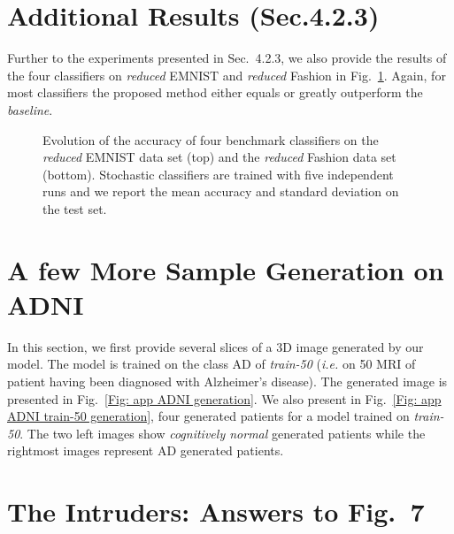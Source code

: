 \documentclass[10pt,journal,compsoc]{IEEEtran}
\begin{document}
\section{Additional Results (Sec.4.2.3)}\label{appendix F}
Further to the experiments presented in Sec.~4.2.3, we also provide the results of the four classifiers on \emph{reduced} EMNIST and \emph{reduced} Fashion in Fig.~\ref{Fig: app Classifiers rob}. Again, for most classifiers the proposed method either equals or greatly outperform the \emph{baseline}. 

\begin{figure}[ht] 
  \centering
  \hfil
  \centering
  
  \caption{Evolution of the accuracy of four benchmark classifiers on the \emph{reduced} EMNIST data set (top) and the \emph{reduced} Fashion data set (bottom). Stochastic classifiers are trained with five independent runs and we report the mean accuracy and standard deviation on the test set.}
  \label{Fig: app Classifiers rob}
  \end{figure}



\section{A few More Sample Generation on ADNI}\label{appendix G}

In this section, we first provide several slices of a 3D image generated by our model. The model is trained on the class AD of \emph{train-50} (\emph{i.e.} on 50 MRI of patient having been diagnosed with Alzheimer's disease). The generated image is presented in Fig.~\ref{Fig: app ADNI generation}. We also present in Fig.~\ref{Fig: app ADNI train-50 generation}, four generated patients for a model trained on \emph{train-50}. The two left images show \emph{cognitively normal} generated patients while the rightmost images represent AD generated patients.  


\section{The Intruders: Answers to Fig.~7}\label{appendix H}
\end{document}

